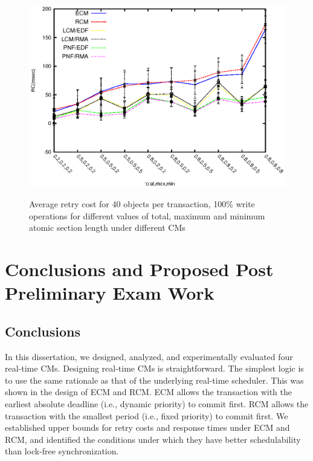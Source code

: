 \documentclass[12pt,english]{report}
\begin{document}
\begin{figure}
{\includegraphics[scale=0.7]
{figures/Abr_dur_20t_420obj_100wr.eps}
\label{fig:20t_ecm_rcm_lcm_pnf_420obj_100wr}
}
\caption{Average retry cost for 40 objects per transaction, 100\% write operations for different values of total, maximum and minimum atomic section length under different CMs}
\label{fig:cm_40obj_per_tx_100wr}
\end{figure}

\chapter{\label{conclusions}Conclusions and Proposed Post Preliminary Exam Work}

\section{Conclusions}

In this dissertation, we designed, analyzed, and experimentally evaluated four real-time CMs. Designing real-time CMs is straightforward. The simplest logic is to use the same rationale as that of the underlying real-time scheduler. This was shown in the design of ECM and RCM. ECM allows the transaction with the earliest absolute deadline (i.e., dynamic priority) to commit first. RCM allows the transaction with the smallest period (i.e., fixed priority) to commit first. We established upper bounds for retry costs and response times under ECM and RCM, and identified the conditions under which they have better schedulability than lock-free synchronization. 
\end{document}
